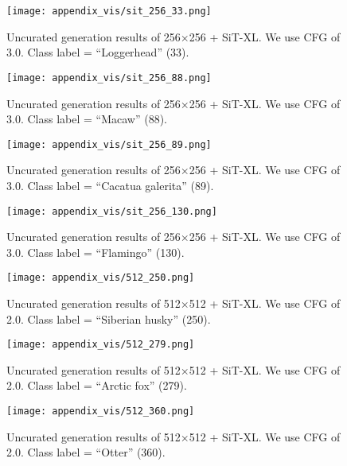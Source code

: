 \begin{figure}[h!]
    \centering
    \texttt{[image: appendix\_vis/sit\_256\_33.png]}
    \caption{Uncurated generation results of 256$\times$256 \method + SiT-XL. We use CFG of 3.0. Class label = ``Loggerhead'' (33).}
\end{figure}

\begin{figure}[h!]
    \centering
    \texttt{[image: appendix\_vis/sit\_256\_88.png]}
    \caption{Uncurated generation results of 256$\times$256 \method + SiT-XL. We use CFG of 3.0. Class label = ``Macaw'' (88).}
\end{figure}

\begin{figure}[h!]
    \centering
    \texttt{[image: appendix\_vis/sit\_256\_89.png]}
    \caption{Uncurated generation results of 256$\times$256 \method + SiT-XL. We use CFG of 3.0. Class label = ``Cacatua galerita'' (89).}
\end{figure}

\begin{figure}[h!]
    \centering
    \texttt{[image: appendix\_vis/sit\_256\_130.png]}
    \caption{Uncurated generation results of 256$\times$256 \method + SiT-XL. We use CFG of 3.0. Class label = ``Flamingo'' (130).}
\end{figure}


\begin{figure}[h!]
    \centering
    \texttt{[image: appendix\_vis/512\_250.png]}
    \caption{Uncurated generation results of 512$\times$512 \method + SiT-XL. We use CFG of 2.0. Class label = ``Siberian husky'' (250).}
\end{figure}

\begin{figure}[h!]
    \centering
    \texttt{[image: appendix\_vis/512\_279.png]}
    \caption{Uncurated generation results of 512$\times$512 \method + SiT-XL. We use CFG of 2.0. Class label = ``Arctic fox'' (279).}
\end{figure}

\begin{figure}[h!]
    \centering
    \texttt{[image: appendix\_vis/512\_360.png]}
    \caption{Uncurated generation results of 512$\times$512 \method + SiT-XL. We use CFG of 2.0. Class label = ``Otter'' (360).}
\end{figure}

